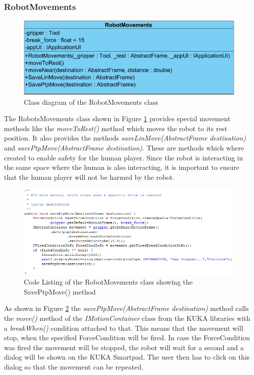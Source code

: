 \documentclass[a4paper]{spie}  %
\begin{document}
\begin{large}
\subsubsection{RobotMovements}
\begin{figure}[h]
\includegraphics[width=12cm]{images/class_roboMov.png}
\centering
\caption{Class diagram of the RobotMovements class}
\label{class_roboMov}
\end{figure}
The RobotsMovements class shown in Figure \ref{class_roboMov} provides special movement methods like the \emph{moveToRest()} method which moves the robot to its rest position. It also provides the methods \emph{saveLinMove(AbstractFrame destination)} and \emph{savePtpMove(AbstractFrame destination)}. These are methods which where  created to enable safety for the human player. Since the robot is interacting in the same space where the human is also interacting, it is important to ensure that the human player will not be harmed by the robot. \\
\begin{figure}[h]
\includegraphics[width=18cm]{images/code_safety.png}
\centering
\caption{Code Listing of the RobotMovements class showing the SavePtpMove() method}
\label{code_safety}
\end{figure}
As shown in Figure \ref{code_safety} the \emph{savePtpMove(AbstractFrame destination)} method calls the \emph{move()} method of the \emph{IMotionContainer} class from the KUKA libraries with a \textit{breakWhen()} condition attached to that. This means that the movement will stop, when the specified ForceCondition will be fired. In case the ForceCondition was fired the movement will be stopped, the robot will wait for a second and a dialog will be shown on the KUKA Smartpad. The user then has to click on this dialog so that the movement can be repeated.

\end{large}
\end{document}
